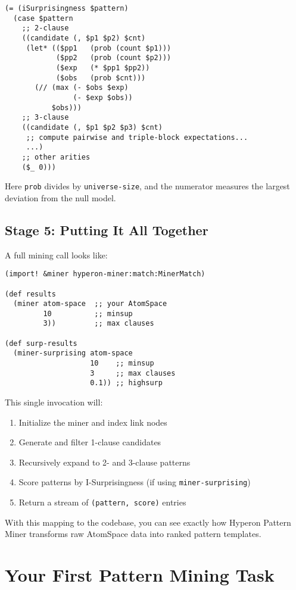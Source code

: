 \begin{verbatim}
(= (iSurprisingness $pattern)
  (case $pattern
    ;; 2-clause
    ((candidate (, $p1 $p2) $cnt)
     (let* (($pp1   (prob (count $p1)))
            ($pp2   (prob (count $p2)))
            ($exp   (* $pp1 $pp2))
            ($obs   (prob $cnt)))
       (// (max (- $obs $exp)
                (- $exp $obs))
           $obs)))
    ;; 3-clause
    ((candidate (, $p1 $p2 $p3) $cnt)
     ;; compute pairwise and triple-block expectations...
     ...)
    ;; other arities
    ($_ 0)))
\end{verbatim}

\noindent
Here \texttt{prob} divides by \texttt{universe-size}, and the numerator measures the largest deviation from the null model.

\subsection{Stage 5: Putting It All Together}

A full mining call looks like:

\begin{verbatim}
(import! &miner hyperon-miner:match:MinerMatch)

(def results
  (miner atom-space  ;; your AtomSpace
         10          ;; minsup
         3))         ;; max clauses

(def surp-results
  (miner-surprising atom-space
                    10    ;; minsup
                    3     ;; max clauses
                    0.1)) ;; highsurp
\end{verbatim}

This single invocation will:

\begin{enumerate}
  \item Initialize the miner and index link nodes
  \item Generate and filter 1-clause candidates
  \item Recursively expand to 2- and 3-clause patterns
  \item Score patterns by I-Surprisingness (if using \texttt{miner-surprising})
  \item Return a stream of \texttt{(pattern, score)} entries
\end{enumerate}

With this mapping to the codebase, you can see exactly how Hyperon Pattern Miner transforms raw AtomSpace data into ranked pattern templates.


\section{Your First Pattern Mining Task}

